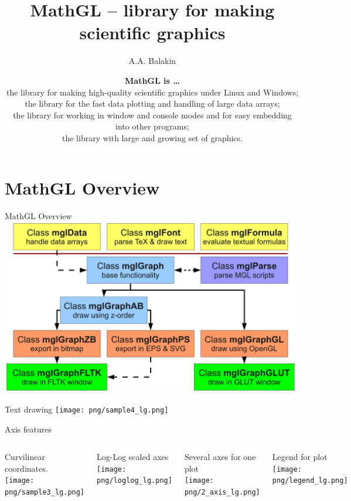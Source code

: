 \documentclass[color=usenames]{beamer}
\begin{document}
\title{MathGL -- library for making scientific graphics}

\author{A.A. Balakin}

\date{\flushleft
\textbf{MathGL is \ldots}\\
the library for making high-quality scientific graphics under Linux and Windows;\\
the library for the fast data plotting and handling of large data arrays;\\
the library for working in window and console modes and for easy embedding into other programs;\\
the library with large and growing set of graphics.
}

\begin{frame}
\titlepage
\end{frame}

\section{MathGL Overview}

\begin{frame}{MathGL Overview}
\includegraphics[width = \textwidth]{classes}
\end{frame}

\begin{frame}{Text drawing}
\texttt{[image: png/sample4\_lg.png]}
\end{frame}

\begin{frame}{Axis features}
\begin{columns}
Curvilinear coordinates.\\
\texttt{[image: png/sample3\_lg.png]}

Log-Log scaled axes\\
\texttt{[image: png/loglog\_lg.png]}

Several axes for one plot\\
\texttt{[image: png/2\_axis\_lg.png]}

Legend for plot\\
\texttt{[image: png/legend\_lg.png]}

\end{columns}
\end{frame}
\end{document}
